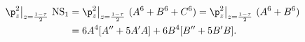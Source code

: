 \begin{equation}
  \begin{split}
    \p_z^2\big|_{z={1-\tau\over 2}} ~{\rm NS}_1 
&= \p_z^2\big|_{z={1-\tau\over 2}} ~(A^6 + B^6 + C^6)  
= \p_z^2\big|_{z={1-\tau\over 2}} ~(A^6 + B^6) \\
&= 6 A^4 [ A''+5A'A] +6 B^4 [B'' +5 B'B].
  \end{split}
\end{equation}

